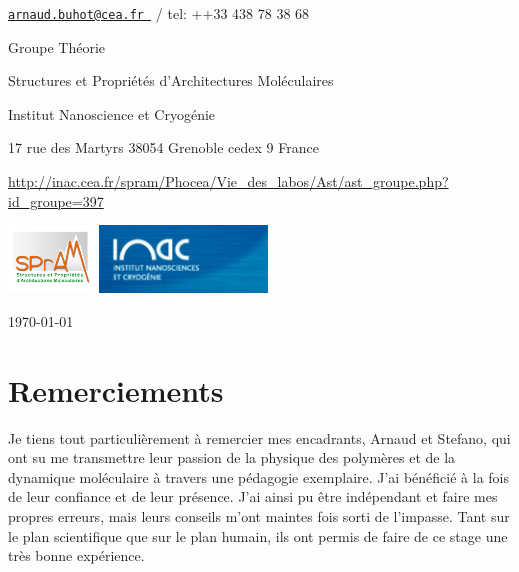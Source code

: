 \documentclass[a4paper,11pt]{article}
\begin{document}
\begin{center}
{\href{mailto:	arnaud.buhot@cea.fr }{\tt 	arnaud.buhot@cea.fr }  / tel: ++33 438 78 38 68



Groupe Théorie

Structures et Propriétés d'Architectures Moléculaires

Institut Nanoscience et Cryogénie
{\it 

17 rue des Martyrs
38054 Grenoble cedex 9
France}

\url{http://inac.cea.fr/spram/Phocea/Vie_des_labos/Ast/ast_groupe.php?id_groupe=397}
} %

\vspace{1cm}


\includegraphics[height=1.8cm]{spram.jpg} \hspace{0.3cm}
\includegraphics[height=1.8cm]{inac.jpg}

\end{center}

\begin{flushright}
\today
\end{flushright}

\vfill
\hfill 




\setlength{\parindent}{10pt}

\section*{Remerciements}

Je tiens tout particulièrement à remercier mes encadrants, Arnaud et Stefano, qui ont su me transmettre leur passion de la physique des polymères et de la dynamique moléculaire à travers une pédagogie exemplaire. J'ai bénéficié à la fois de leur confiance et de leur présence. J'ai ainsi pu être indépendant et faire mes propres erreurs, mais leurs conseils m'ont maintes fois sorti de l'impasse. Tant sur le plan scientifique que sur le plan humain, ils ont permis de faire de ce stage une très bonne expérience.
\end{document}
